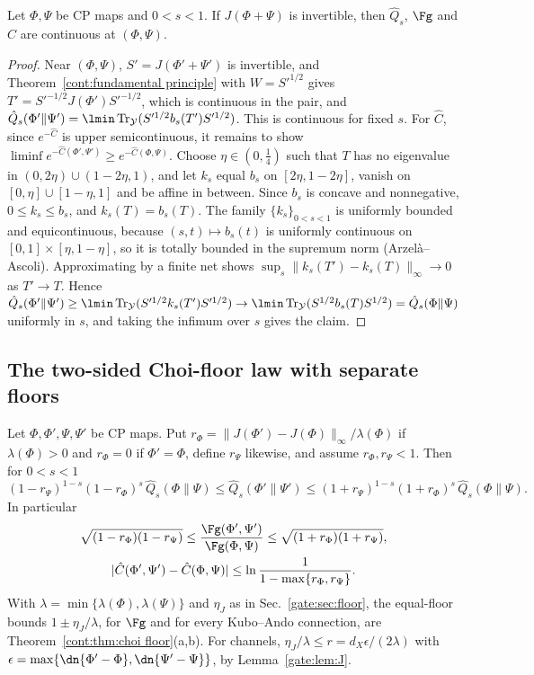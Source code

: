\begin{proposition}\label{gate:smp:prop:cont}
Let $\Phi,\Psi$ be CP maps and $0<s<1$. If $J(\Phi+\Psi)$ is invertible, then $\hat Q_s$, $\Fg$ and $\hat C$ are continuous at $(\Phi,\Psi)$.
\end{proposition}

\begin{proof}
Near $(\Phi,\Psi)$, $S'=J(\Phi'+\Psi')$ is invertible, and Theorem~\ref{cont:fundamental principle} with $W=S'^{1/2}$ gives $T'=S'^{-1/2}J(\Phi')S'^{-1/2}$, which is continuous in the pair, and $\hat Q_s(\Phi'\|\Psi')=\lmin\Tr_{\mathcal Y}(S'^{1/2}b_s(T')S'^{1/2})$. This is continuous for fixed $s$. For $\hat C$, since $e^{-\hat C}$ is upper semicontinuous, it remains to show $\liminf e^{-\hat C(\Phi',\Psi')}\ge e^{-\hat C(\Phi,\Psi)}$. Choose $\eta\in(0,\frac14)$ such that $T$ has no eigenvalue in $(0,2\eta)\cup(1-2\eta,1)$, and let $k_s$ equal $b_s$ on $[2\eta,1-2\eta]$, vanish on $[0,\eta]\cup[1-\eta,1]$ and be affine in between. Since $b_s$ is concave and nonnegative, $0\le k_s\le b_s$, and $k_s(T)=b_s(T)$. The family $\{k_s\}_{0<s<1}$ is uniformly bounded and equicontinuous, because $(s,t)\mapsto b_s(t)$ is uniformly continuous on $[0,1]\times[\eta,1-\eta]$, so it is totally bounded in the supremum norm (Arzel\`a--Ascoli). Approximating by a finite net shows $\sup_s\|k_s(T')-k_s(T)\|_\infty\to0$ as $T'\to T$. Hence $\hat Q_s(\Phi'\|\Psi')\ge\lmin\Tr_{\mathcal Y}(S'^{1/2}k_s(T')S'^{1/2})\to\lmin\Tr_{\mathcal Y}(S^{1/2}b_s(T)S^{1/2})=\hat Q_s(\Phi\|\Psi)$ uniformly in $s$, and taking the infimum over $s$ gives the claim.
\end{proof}

\subsection*{The two-sided Choi-floor law with separate floors}

\begin{proposition}\label{gate:smp:prop:twosided}
Let $\Phi,\Phi',\Psi,\Psi'$ be CP maps. Put $r_\Phi=\|J(\Phi')-J(\Phi)\|_\infty/\lambda(\Phi)$ if $\lambda(\Phi)>0$ and $r_\Phi=0$ if $\Phi'=\Phi$, define $r_\Psi$ likewise, and assume $r_\Phi,r_\Psi<1$. Then for $0<s<1$
\begin{equation}\label{gate:smp:eq:twosided}
(1-r_\Psi)^{1-s}(1-r_\Phi)^s\,\hat Q_s(\Phi\|\Psi)\le\hat Q_s(\Phi'\|\Psi')\le(1+r_\Psi)^{1-s}(1+r_\Phi)^s\,\hat Q_s(\Phi\|\Psi).
\end{equation}
In particular
\begin{gather*}
\sqrt{(1-r_\Phi)(1-r_\Psi)}\le\frac{\Fg(\Phi',\Psi')}{\Fg(\Phi,\Psi)}\le\sqrt{(1+r_\Phi)(1+r_\Psi)},\\
|\hat C(\Phi',\Psi')-\hat C(\Phi,\Psi)|\le\ln\frac1{1-\max\{r_\Phi,r_\Psi\}}.
\end{gather*}
With $\lambda=\min\{\lambda(\Phi),\lambda(\Psi)\}$ and $\eta_J$ as in Sec.~\ref{gate:sec:floor}, the equal-floor bounds $1\pm\eta_J/\lambda$, for $\Fg$ and for every Kubo--Ando connection, are Theorem~\ref{cont:thm:choi floor}(a,b).
For channels, $\eta_J/\lambda\le r=d_X\epsilon/(2\lambda)$ with $\epsilon=\max\{\dn{\Phi'-\Phi},\dn{\Psi'-\Psi}\}$, by Lemma~\ref{gate:lem:J}.
\end{proposition}

